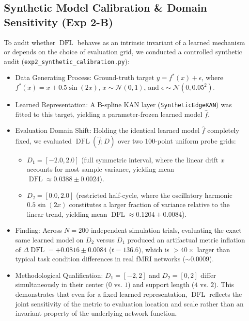 \documentclass[11pt,a4paper]{article}
\begin{document}
\subsection{Synthetic Model Calibration \& Domain Sensitivity (Exp 2-B)}
To audit whether $\operatorname{DFL}$ behaves as an intrinsic invariant of a learned mechanism or depends on the choice of evaluation grid, we conducted a controlled synthetic audit (\texttt{exp2\_synthetic\_calibration.py}):
\begin{itemize}
    \item Data Generating Process: Ground-truth target $y = f^*(x) + \epsilon$, where $f^*(x) = x + 0.5\sin(2x)$, $x \sim \mathcal{N}(0, 1)$, and $\epsilon \sim \mathcal{N}(0, 0.05^2)$.
    \item Learned Representation: A B-spline KAN layer (\texttt{SyntheticEdgeKAN}) was fitted to this target, yielding a parameter-frozen learned model $\hat{f}$.
    \item Evaluation Domain Shift: Holding the identical learned model $\hat{f}$ completely fixed, we evaluated $\operatorname{DFL}(\hat{f}; D)$ over two 100-point uniform probe grids:
    \begin{itemize}
        \item $D_1 = [-2.0, 2.0]$ (full symmetric interval, where the linear drift $x$ accounts for most sample variance, yielding mean $\operatorname{DFL} \approx 0.0388 \pm 0.0024$).
        \item $D_2 = [0.0, 2.0]$ (restricted half-cycle, where the oscillatory harmonic $0.5\sin(2x)$ constitutes a larger fraction of variance relative to the linear trend, yielding mean $\operatorname{DFL} \approx 0.1204 \pm 0.0084$).
    \end{itemize}
    \item Finding: Across $N = 200$ independent simulation trials, evaluating the exact same learned model on $D_2$ versus $D_1$ produced an artifactual metric inflation of $\Delta \operatorname{DFL} = +0.0816 \pm 0.0084$ ($t = 136.6$), which is $>40\times$ larger than typical task condition differences in real fMRI networks ($\sim 0.0009$).
    \item Methodological Qualification: $D_1 = [-2, 2]$ and $D_2 = [0, 2]$ differ simultaneously in their center ($0$ vs. $1$) and support length ($4$ vs. $2$). This demonstrates that even for a fixed learned representation, $\operatorname{DFL}$ reflects the joint sensitivity of the metric to evaluation location and scale rather than an invariant property of the underlying network function.
\end{itemize}
\end{document}
